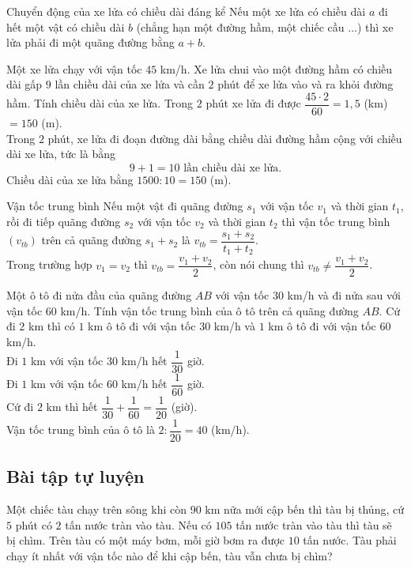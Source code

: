 \begin{dang}{Chuyển động của xe lửa có chiều dài đáng kể}
Nếu một xe lửa có chiều dài $a$ đi hết một vật có chiều dài $b$ (chẳng hạn một đường hầm, một chiếc cầu $\dots$) thì xe lửa phải đi một quãng đường bằng $a+b$.
\end{dang}
\begin{vd}
Một xe lửa chạy với vận tốc $45$ km/h. Xe lửa chui vào một đường hầm có chiều dài gấp $9$ lần chiều dài của xe lửa và cần $2$ phút để xe lửa vào và ra khỏi đường hầm. Tính chiều dài của xe lửa.
	\loigiai
	{
Trong $2$ phút xe lửa đi được $\dfrac{45\cdot 2}{60}= 1{,}5$ (km) $=150$ (m).\\
Trong $2$ phút, xe lửa đi đoạn đường dài bằng chiều dài đường hầm cộng với chiều dài xe lửa, tức là bằng
\[9+1=10\text{ lần chiều dài xe lửa.} \]
Chiều dài của xe lửa bằng $1500:10=150$ (m).
	}
\end{vd}
\begin{dang}{Vận tốc trung bình}
Nếu một vật đi quãng đường $s_1$ với vận tốc $v_1$ và thời gian $t_1$, rồi đi tiếp quãng đường $s_2$ với vận tốc $v_2$ và thời gian $t_2$ thì vận tốc trung bình $(v_{tb})$ trên cả quãng đường $s_1+s_2$ là $v_{tb}=\dfrac{s_1+s_2}{t_1+t_2}$.\\
Trong trường hợp $v_1=v_2$ thì $v_{tb}=\dfrac{v_1+v_2}{2}$, còn nói chung thì $v_{tb}\neq \dfrac{v_1+v_2}{2}$.
\end{dang}
\begin{vd}
Một ô tô đi nửa đầu của quãng đường $AB$ với vận tốc $30$ km/h và đi nửa sau với vận tốc $60$ km/h. Tính vận tốc trung bình của ô tô trên cả quãng đường $AB$.
	\loigiai
	{
Cứ đi $2$ km thì có $1$ km ô tô đi với vận tốc $30$ km/h và $1$ km ô tô đi với vận tốc $60$ km/h.\\
Đi $1$ km với vận tốc $30$ km/h hết $\dfrac{1}{30}$ giờ.\\
Đi $1$ km với vận tốc $60$ km/h hết $\dfrac{1}{60}$ giờ.\\
Cứ đi $2$ km thì hết $\dfrac{1}{30} + \dfrac{1}{60}=\dfrac{1}{20}$ (giờ).\\
Vận tốc trung bình của ô tô là $2 :\dfrac{1}{20}= 40$ (km/h).
	}
\end{vd}
\subsection{Bài tập tự luyện}
\begin{bt}
	Một chiếc tàu chạy trên sông khi còn 90 $\mathrm{km}$ nữa mới cập bến thì tàu bị thủng, cứ $5$ phút có $2$ tấn nước tràn vào tàu. Nếu có $105$ tấn nước tràn vào tàu thì tàu sẽ bị chìm. Trên tàu có một máy bơm, mỗi giờ bơm ra được $10$ tấn nước. Tàu phải chạy ít nhất với vận tốc nào để khi cập bến, tàu vẫn chưa bị chìm?
\end{bt}

